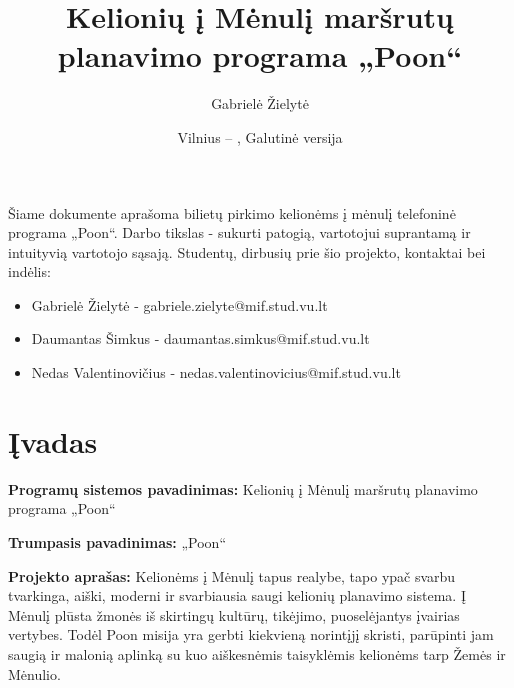 \documentclass{VUMIFPSkursinis}
\title{Kelionių į Mėnulį maršrutų planavimo programa „Poon“}
\author{Gabrielė Žielytė}
\date{Vilnius – \the\year, Galutinė versija}
\begin{document}
	
\maketitle

\thispagestyle{empty}
\tableofcontents


Šiame dokumente aprašoma bilietų pirkimo kelionėms į mėnulį telefoninė programa „Poon“. Darbo tikslas - sukurti patogią, vartotojui suprantamą ir intuityvią vartotojo sąsają.
Studentų, dirbusių prie šio projekto, kontaktai bei indėlis:
\begin{itemize}
\item Gabrielė Žielytė - gabriele.zielyte@mif.stud.vu.lt
\item Daumantas Šimkus - daumantas.simkus@mif.stud.vu.lt
\item Nedas Valentinovičius - nedas.valentinovicius@mif.stud.vu.lt
\end{itemize}
\thispagestyle{empty}

\cleardoublepage{}
\setcounter{page}{4}

\section{Įvadas}
\textbf{Programų sistemos pavadinimas: } Kelionių į Mėnulį maršrutų planavimo programa „Poon“
\bigskip

\textbf{Trumpasis pavadinimas: } „Poon“
\bigskip




\textbf{Projekto aprašas: } Kelionėms į Mėnulį tapus realybe, tapo ypač svarbu tvarkinga, aiški, moderni ir svarbiausia saugi kelionių planavimo sistema. Į Mėnulį plūsta žmonės iš skirtingų kultūrų, tikėjimo, puoselėjantys įvairias vertybes. Todėl Poon misija yra gerbti kiekvieną norintįjį skristi, parūpinti jam saugią ir malonią aplinką su kuo aiškesnėmis taisyklėmis kelionėms tarp Žemės ir Mėnulio.
\end{document}
